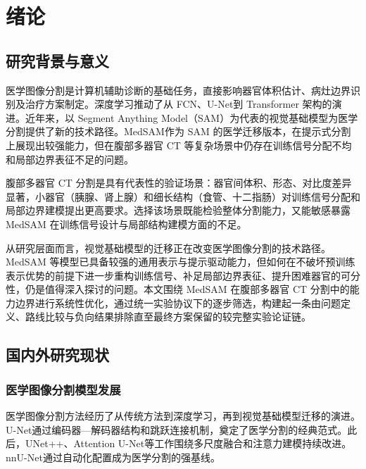 \chapter{绪论}

\section{研究背景与意义}

医学图像分割是计算机辅助诊断的基础任务，直接影响器官体积估计、病灶边界识别及治疗方案制定\cite{litjens2017survey}。深度学习推动了从 FCN\cite{long2015fcn}、U-Net\cite{ronneberger2015unet}到 Transformer 架构\cite{chen2021transunet,cao2022swinunet}的演进。近年来，以 Segment Anything Model（SAM）\cite{kirillov2023segment}为代表的视觉基础模型为医学分割提供了新的技术路径。MedSAM\cite{ma2024medsam}作为 SAM 的医学迁移版本，在提示式分割上展现出较强能力，但在腹部多器官 CT 等复杂场景中仍存在训练信号分配不均和局部边界表征不足的问题。

腹部多器官 CT 分割是具有代表性的验证场景：器官间体积、形态、对比度差异显著，小器官（胰腺、肾上腺）和细长结构（食管、十二指肠）对训练信号分配和局部边界建模提出更高要求\cite{hesamian2019survey}。选择该场景既能检验整体分割能力，又能敏感暴露 MedSAM 在训练信号设计与局部结构建模方面的不足。

从研究层面而言，视觉基础模型的迁移正在改变医学图像分割的技术路径\cite{bommasani2021foundation,moor2023foundation}。MedSAM 等模型已具备较强的通用表示与提示驱动能力，但如何在不破坏预训练表示优势的前提下进一步重构训练信号、补足局部边界表征、提升困难器官的可分性，仍是值得深入探讨的问题。本文围绕 MedSAM 在腹部多器官 CT 分割中的能力边界进行系统性优化，通过统一实验协议下的逐步筛选，构建起一条由问题定义、路线比较与负向结果排除直至最终方案保留的较完整实验论证链。

\section{国内外研究现状}

\subsection{医学图像分割模型发展}

医学图像分割方法经历了从传统方法到深度学习，再到视觉基础模型迁移的演进\cite{wang2022medseg_survey}。U-Net\cite{ronneberger2015unet}通过编码器—解码器结构和跳跃连接机制，奠定了医学分割的经典范式。此后，UNet++\cite{zhou2018unetpp}、Attention U-Net\cite{oktay2018attention}等工作围绕多尺度融合和注意力建模持续改进。nnU-Net\cite{isensee2021nnunet}通过自动化配置成为医学分割的强基线。

